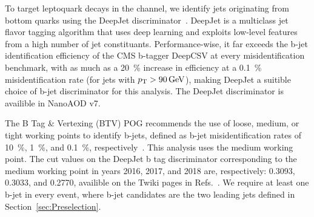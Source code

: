 To target leptoquark decays in the \mumubj channel, we identify jets originating from bottom quarks using the DeepJet discriminator~\cite{DeepJet}. DeepJet is a multiclass jet flavor tagging algorithm that uses deep learning and exploits low-level features from a high number of jet constituants. Performance-wise, it far exceeds the b-jet identification efficiency of the CMS b-tagger DeepCSV at every misidentification benchmark, with as much as a \SI{20}{\%} increase in efficiency at a \SI{0.1}{\%} misidentification rate (for jets with $\pt > \SI{90}{\GeV}$), making DeepJet a suitible choice of b-jet discriminator for this analysis. The DeepJet discriminator is availible in NanoAOD v7.

The B Tag \& Vertexing (BTV) POG recommends the use of loose, medium, or tight working points to identify b-jets, defined as b-jet misidentification rates of \SI{10}{\%}, \SI{1}{\%}, and \SI{0.1}{\%}, respectively~\cite{BTagID}. This analysis uses the medium working point. The cut values on the DeepJet b tag discriminator corresponding to the medium working point in years 2016, 2017, and 2018 are, respectively: 0.3093, 0.3033, and 0.2770, availible on the Twiki pages in Refs.~\cite{BtagTwiki2016}\cite{BtagTwiki2017}\cite{BtagTwiki2018}. We require at least one b-jet in every event, where b-jet candidates are the two leading jets defined in Section~\ref{sec:Preselection}.